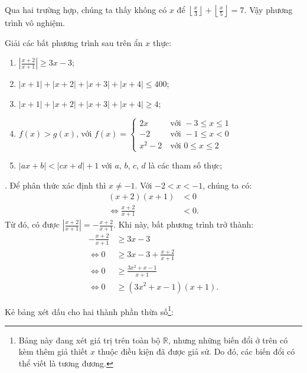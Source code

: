 Qua hai trường hợp, chúng ta thấy không có $x$ để $\left\lfloor \frac{x}{3} \right\rfloor + \left\lfloor \frac{x}{5} \right\rfloor = 7$. Vậy phương trình vô nghiệm.

\exercise Giải các bất phương trình sau trên ẩn $x$ thực:
\begin{enumerate}
   \item $\left|\frac{x + 2}{x + 1}\right| \geq 3x - 3$;
   \item $|x + 1| + |x + 2| + |x + 3| + |x + 4| \leq 400$;
   \item $|x + 1| + |x + 2| + |x + 3| + |x + 4| \geq 4$;
   \item $f(x) > g(x)$, với $f(x) = \begin{cases}
      2x &\ \text{với } -3 \leq x \leq 1 \\
      -2 &\ \text{với } -1 \leq x < 0 \\
      x^2 - 2 &\ \text{với } 0 \le x \le 2
   \end{cases}$
   \item $|ax + b| < |cx + d| + 1$ với $a$, $b$, $c$, $d$ là các tham số thực;
\end{enumerate}

\solution

\setcounter{subexercise}{1}
. Để phân thức xác định thì $x \neq -1$. Với $-2 < x < -1$, chúng ta có:
\begin{align*}
   (x + 2)(x + 1) &< 0 \\
   \iff \frac{x + 2}{x + 1} &< 0.
\end{align*}
Từ đó, có được $\left| \frac{x + 2}{x + 1} \right| = - \frac{x + 2}{x + 1} $. Khi này, bất phương trình trở thành:
\begin{align*}
   - \frac{x + 2}{x + 1} &\geq 3x - 3 \\
   \iff 0 &\geq 3x - 3 + \frac{x + 2}{x + 1} \\
   \iff 0 &\geq \frac{3x^2 + x - 1}{x + 1} \\
   \iff 0 &\geq \left(3x^2 + x - 1\right)(x + 1).
\end{align*}

 Kẻ bảng xét dấu cho hai thành phần thừa số\footnote{Bảng này đang xét giá trị trên toàn bộ $\mathbb{R}$, nhưng những biến đổi ở trên có kèm thêm giả thiết $x$ thuộc điều kiện đã được giả sử. Do đó, các biến đổi có thể viết là tương đương.}:

